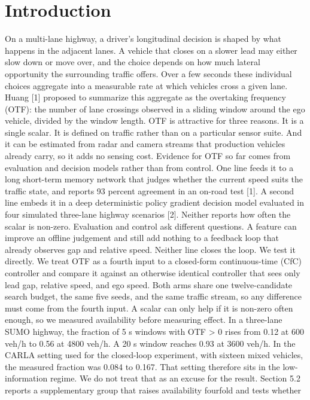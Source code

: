\documentclass[journal]{IEEEtran}
\begin{document}
\section{Introduction}
On a multi-lane highway, a driver's longitudinal decision is shaped by what happens in the adjacent
lanes. A vehicle that closes on a slower lead may either slow down or move over, and the choice
depends on how much lateral opportunity the surrounding traffic offers. Over a few seconds these
individual choices aggregate into a measurable rate at which vehicles cross a given lane.
Huang [1] proposed to summarize this aggregate as the overtaking frequency (OTF): the number of
lane crossings observed in a sliding window around the ego vehicle, divided by the window length.
OTF is attractive for three reasons. It is a single scalar. It is defined on traffic rather than on a
particular sensor suite. And it can be estimated from radar and camera streams that production
vehicles already carry, so it adds no sensing cost.
Evidence for OTF so far comes from evaluation and decision models rather than from control. One line
feeds it to a long short-term memory network that judges whether the current speed suits the traffic
state, and reports 93 percent agreement in an on-road test [1]. A second line embeds
it in a deep deterministic policy gradient decision model evaluated in four simulated three-lane
highway scenarios [2]. Neither reports how often the scalar is non-zero. Evaluation
and control ask different questions. A feature can improve an offline judgement and still add nothing
to a feedback loop that already observes gap and relative speed. Neither line closes the loop.
We test it directly. We treat OTF as a fourth input to a closed-form continuous-time (CfC) controller
and compare it against an otherwise identical controller that sees only lead gap, relative speed, and
ego speed. Both arms share one twelve-candidate search budget, the same five seeds, and the same
traffic stream, so any difference must come from the fourth input.
A scalar can only help if it is non-zero often enough, so we measured availability before measuring
effect. In a three-lane SUMO highway, the fraction of 5 s windows with OTF > 0 rises from 0.12 at
600 veh/h to 0.56 at 4800 veh/h. A 20 s window reaches 0.93 at 3600 veh/h. In the CARLA setting used
for the closed-loop experiment, with sixteen mixed vehicles, the measured fraction was 0.084 to 0.167.
That setting therefore sits in the low-information regime. We do not treat that as an excuse for the
result. Section 5.2 reports a supplementary group that raises availability fourfold and tests whether
\end{document}
